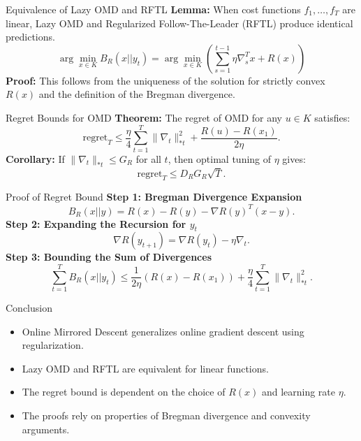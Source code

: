 \documentclass{beamer}
\begin{document}
\begin{frame}{Equivalence of Lazy OMD and RFTL}
    \textbf{Lemma:} When cost functions $f_1, \dots, f_T$ are linear, Lazy OMD and Regularized Follow-The-Leader (RFTL) produce identical predictions.
    \begin{equation}
        \arg\min_{x \in K} B_R(x || y_t) = \arg\min_{x \in K} \left( \sum_{s=1}^{t-1} \eta \nabla_s^T x + R(x) \right)
    \end{equation}
    \textbf{Proof:} This follows from the uniqueness of the solution for strictly convex $R(x)$ and the definition of the Bregman divergence.
\end{frame}

\begin{frame}{Regret Bounds for OMD}
    \textbf{Theorem:} The regret of OMD for any $u \in K$ satisfies:
    \begin{equation}
        \text{regret}_T \leq \frac{\eta}{4} \sum_{t=1}^{T} \| \nabla_t \|_{*t}^2 + \frac{R(u) - R(x_1)}{2 \eta}.
    \end{equation}
    \textbf{Corollary:} If $\| \nabla_t \|_{*t} \leq G_R$ for all $t$, then optimal tuning of $\eta$ gives:
    \begin{equation}
        \text{regret}_T \leq D_R G_R \sqrt{T}.
    \end{equation}
\end{frame}

\begin{frame}{Proof of Regret Bound}
    \textbf{Step 1: Bregman Divergence Expansion}
    \begin{equation}
        B_R(x || y) = R(x) - R(y) - \nabla R(y)^T (x - y).
    \end{equation}
    \textbf{Step 2: Expanding the Recursion for $y_t$}
    \begin{equation}
        \nabla R(y_{t+1}) = \nabla R(y_t) - \eta \nabla_t.
    \end{equation}
    \textbf{Step 3: Bounding the Sum of Divergences}
    \begin{equation}
        \sum_{t=1}^{T} B_R(x || y_t) \leq \frac{1}{2\eta} (R(x) - R(x_1)) + \frac{\eta}{4} \sum_{t=1}^{T} \| \nabla_t \|_{*t}^2.
    \end{equation}
\end{frame}

\begin{frame}{Conclusion}
    \begin{itemize}
        \item Online Mirrored Descent generalizes online gradient descent using regularization.
        \item Lazy OMD and RFTL are equivalent for linear functions.
        \item The regret bound is dependent on the choice of $R(x)$ and learning rate $\eta$.
        \item The proofs rely on properties of Bregman divergence and convexity arguments.
    \end{itemize}
\end{frame}
\end{document}
